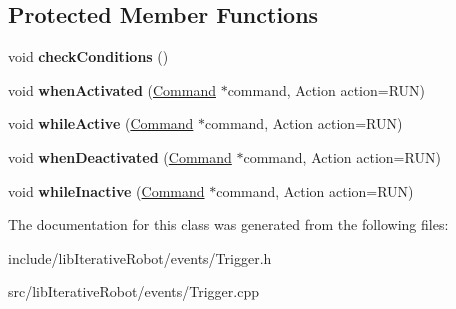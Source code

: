 \subsection*{Protected Member Functions}
\begin{DoxyCompactItemize}
\item 
\mbox{\label{classlib_iterative_robot_1_1_trigger_ac89c07cd514a1af516dd7f773cbedcab}} 
void {\bfseries check\+Conditions} ()
\item 
\mbox{\label{classlib_iterative_robot_1_1_trigger_af36fbbe12844b62498a1c48593e75c92}} 
void {\bfseries when\+Activated} (\mbox{\hyperlink{classlib_iterative_robot_1_1_command}{Command}} $\ast$command, Action action=R\+UN)
\item 
\mbox{\label{classlib_iterative_robot_1_1_trigger_a7de1ef016c285eb489e0f74e579fce84}} 
void {\bfseries while\+Active} (\mbox{\hyperlink{classlib_iterative_robot_1_1_command}{Command}} $\ast$command, Action action=R\+UN)
\item 
\mbox{\label{classlib_iterative_robot_1_1_trigger_af4b9afc4013722d4e3492d3c9ed97fdd}} 
void {\bfseries when\+Deactivated} (\mbox{\hyperlink{classlib_iterative_robot_1_1_command}{Command}} $\ast$command, Action action=R\+UN)
\item 
\mbox{\label{classlib_iterative_robot_1_1_trigger_a90128b3d0b6b0ccae96cd0fd0472c85b}} 
void {\bfseries while\+Inactive} (\mbox{\hyperlink{classlib_iterative_robot_1_1_command}{Command}} $\ast$command, Action action=R\+UN)
\end{DoxyCompactItemize}


The documentation for this class was generated from the following files\+:\begin{DoxyCompactItemize}
\item 
include/lib\+Iterative\+Robot/events/Trigger.\+h\item 
src/lib\+Iterative\+Robot/events/Trigger.\+cpp\end{DoxyCompactItemize}
